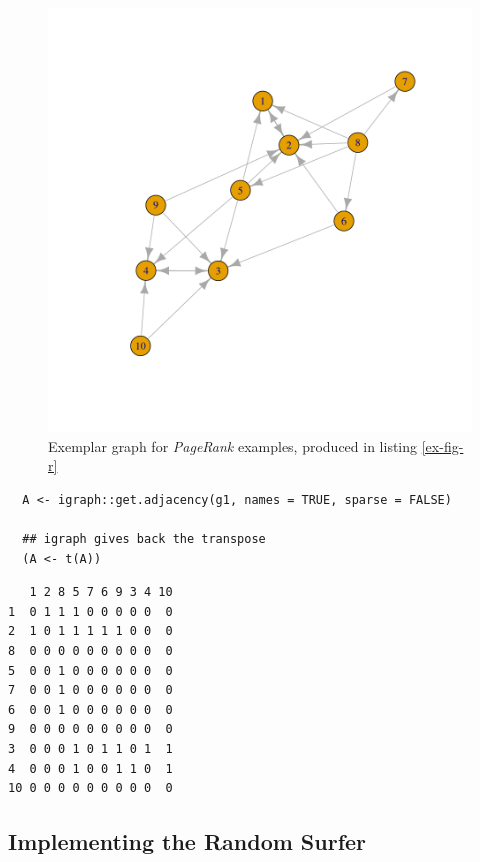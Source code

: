 \documentclass[11pt]{article}
\begin{document}
\begin{figure}[htbp]
\centering
\includegraphics[width=12cm]{media/example-graph-power-walk.png}
\caption{\label{example-rs-graph}Exemplar graph for \emph{PageRank} examples, produced in listing \ref{ex-fig-r}}
\end{figure}



\begin{listing}[htbp]
\begin{verbatim}
  A <- igraph::get.adjacency(g1, names = TRUE, sparse = FALSE)

  ## igraph gives back the transpose
  (A <- t(A))
\end{verbatim}
\caption{\label{adj-mat-random-surf}Return the Adjacency Matrix corresponding to figure \ref{example-rs-graph}}
\end{listing}

\begin{verbatim}
   1 2 8 5 7 6 9 3 4 10
1  0 1 1 1 0 0 0 0 0  0
2  1 0 1 1 1 1 1 0 0  0
8  0 0 0 0 0 0 0 0 0  0
5  0 0 1 0 0 0 0 0 0  0
7  0 0 1 0 0 0 0 0 0  0
6  0 0 1 0 0 0 0 0 0  0
9  0 0 0 0 0 0 0 0 0  0
3  0 0 0 1 0 1 1 0 1  1
4  0 0 0 1 0 0 1 1 0  1
10 0 0 0 0 0 0 0 0 0  0
\end{verbatim}


\subsection{Implementing the Random Surfer}
\label{sec:orgbcc4bd6}
\end{document}

